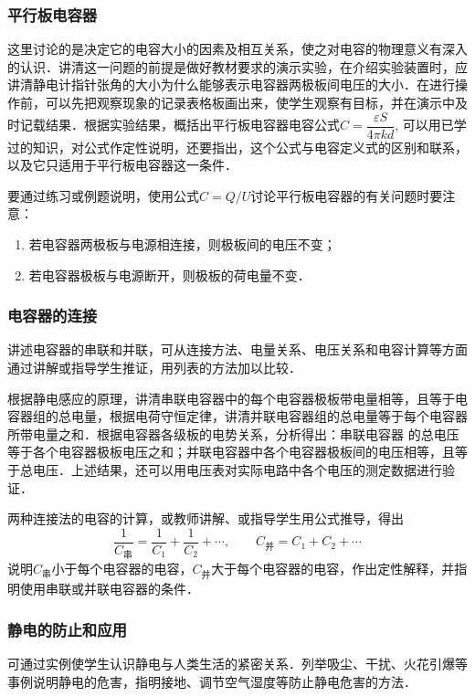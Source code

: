 \subsubsection{平行板电容器}

这里讨论的是决定它的电容大小的因素及相互关系，使之对电容的物理意义有深入的认识．讲清这一问题的前提是做好教材要求的演示实验，在介绍实验装置时，应讲清静电计指针张角的大小为什么能够表示电容器两极板间电压的大小．在进行操作前，可以先把观察现象的记录表格板画出来，使学生观察有目标，并在演示中及时记载结果．根据实验结果，概括出平行板电容器电容公式$C=\dfrac{\varepsilon S}{4\pi kd}$, 可以用已学过的知识，对公式作定性说明，还要指出，这个公式与电容定义式的区别和联系，以及它只适用于平行板电容器这一条件．

要通过练习或例题说明，使用公式$C=Q/U$讨论平行板电容器的有关问题时要注意：
\begin{enumerate}
    \item 若电容器两极板与电源相连接，则极板间的电压不变；
    \item 若电容器极板与电源断开，则极板的荷电量不变．
\end{enumerate}



\subsubsection{电容器的连接}

讲述电容器的串联和并联，可从连接方法、电量关系、电压关系和电容计算等方面通过讲解或指导学生推证，用列表的方法加以比较．

根据静电感应的原理，讲清串联电容器中的每个电容器极板带电量相等，且等于电容器组的总电量，根据电荷守恒定律，讲清并联电容器组的总电量等于每个电容器所带电量之和．根据电容器各级板的电势关系，分析得出：串联电容器
的总电压等于各个电容器极板电压之和；并联电容器中各个电容器极板间的电压相等，且等于总电压．上述结果，还可以用电压表对实际电路中各个电压的测定数据进行验证．

两种连接法的电容的计算，或教师讲解、或指导学生用公式推导，得出
\[\frac{1}{C_{\text{串}}}=\frac{1}{C_1}+\frac{1}{C_2}+\cdots,\qquad C_{\text{并}}=C_1+C_2+\cdots\]
说明$C_{\text{串}}$小于每个电容器的电容，$C_{\text{并}}$大于每个电容器的电容，作出定性解释，并指明使用串联或并联电容器的条件．

\subsubsection{静电的防止和应用}

可通过实例使学生认识静电与人类生活的紧密关系．列举吸尘、干扰、火花引爆等事例说明静电的危害，指明接地、调节空气湿度等防止静电危害的方法．

